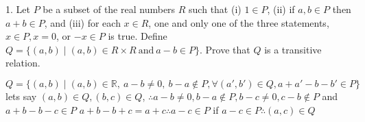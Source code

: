 1. Let $P$ be a subset of the real numbers $R$ such that (i) $1 \in P$, (ii) if $a,b \in P$ then $a + b \in P$, and (iii) for each $x \in R$, one and only one of the three statements, $x \in P, x =0 $, or $-x \in P$ is true. Define $Q = \{ (a, b) \mid (a, b) \in R \times R \ \text{and}\ a-b \in P\}$. Prove that $Q$ is a transitive relation.

$Q =  \{ (a, b) \mid (a, b) \in \mathbb{R},\  a - b \not = 0,\ b-a \not \in P, \forall(a', b') \in Q, a+a'-b-b' \in P\}$
lets say $(a, b) \in Q, (b,c) \in Q$,
$\therefore a-b \not = 0, b-a \not \in P, b - c \not = 0, c-b \not \in P$ and $a+b - b-c \in P$
$a+b - b+c = a+c \therefore a-c \in P$
if $a-c \in P \therefore (a, c) \in Q$


